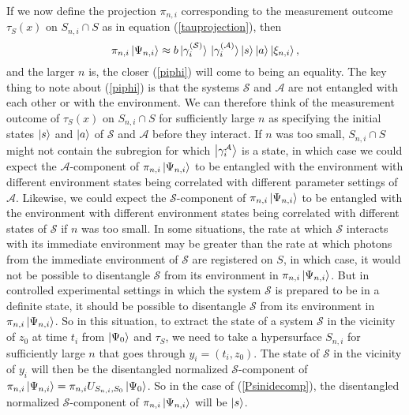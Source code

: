 If we now define the projection $\pi_{n,i}$ corresponding to the measurement outcome  $\tau_S(x)$ on $S_{n,i}\cap S$ as in equation (\ref{tauprojection}), then
\begin{equation}\label{piphi}
	\pi_{n,i}\ket{\Psi_{n,i}}\approx b\ket*{\gamma_i^{(\mathcal{S})}}\ket*{\gamma_i^{(\mathcal{A})}}\ket{s}\ket{a}\ket{\xi_{n,i}},
\end{equation}
and the larger $n$ is, the closer (\ref{piphi}) will come to being an equality. The key thing to note about (\ref{piphi}) is that the systems $\mathcal{S}$ and $\mathcal{A}$ are not entangled with each other or with the environment. We can therefore think of the measurement outcome of $\tau_S(x)$ on $S_{n,i}\cap S$ for sufficiently large $n$ as specifying the initial states $\ket{s}$ and $\ket{a}$ of   $\mathcal{S}$ and $\mathcal{A}$ before they interact. If $n$ was too small, $S_{n,i}\cap S$ might not contain the subregion for which $\ket{\gamma_i^{\mathcal{A}}}$ is a state, in which case we could expect the $\mathcal{A}$-component of $\pi_{n,i}\ket{\Psi_{n,i}}$ to be entangled with the environment with different environment states being correlated with different parameter settings of $\mathcal{A}$. Likewise, we could expect the $\mathcal{S}$-component of $\pi_{n,i}\ket{\Psi_{n,i}}$ to be entangled with  the environment with different environment states being correlated with different states of $\mathcal{S}$ if $n$ was too small. In some situations, the rate at which $\mathcal{S}$ interacts with its immediate environment may be greater than the rate at which photons from the immediate environment of $\mathcal{S}$ are registered on $S$, in which case, it would not be possible to disentangle $\mathcal{S}$ from its environment in $\pi_{n,i}\ket{\Psi_{n,i}}$. But in controlled experimental settings in which the system $\mathcal{S}$ is prepared to be in a definite state, it should be possible to disentangle $\mathcal{S}$ from its environment in $\pi_{n,i}\ket{\Psi_{n,i}}$. So in this situation, to extract the state of a system $\mathcal{S}$ in the vicinity of $z_0$ at time $t_i$ from $\ket{\Psi_0}$ and $\tau_S$, we need to take a hypersurface $S_{n,i}$ for sufficiently large $n$ that goes through $y_i=(t_i, z_0)$. The state of $\mathcal{S}$ in the vicinity of $y_i$ will then be the disentangled normalized $\mathcal{S}$-component of $\pi_{n,i}\ket{\Psi_{n,i}}=\pi_{n,i}U_{S_{n,i},S_0}\ket{\Psi_0}$. So in the case of (\ref{Psinidecomp}), the disentangled normalized $\mathcal{S}$-component of $\pi_{n,i}\ket{\Psi_{n,i}}$ will be $\ket{s}$.

